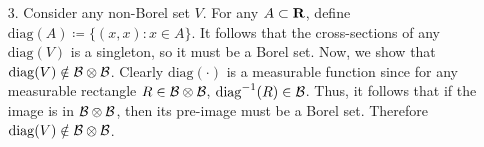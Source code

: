 \documentclass{article}
\theoremstyle{remark}
\newtheorem{claim}{Claim}
\newenvironment{poc}{\textit{Proof of claim:}}{\qed\\}
\begin{document}
\thispagestyle{firstpage}
\begin{enumerate}[leftmargin=*]
    \item[3.] Consider any non-Borel set $V$. For any $A \subset \mathbf{R}$, define $\mathrm{diag}(A) \coloneqq \{(x,x): x \in A\}$. It follows that the cross-sections of any $\mathrm{diag}(V)$ is a singleton, so it must be a Borel set. Now, we show that $\mathrm{diag}(V) \notin \mathcal{B} \otimes \mathcal{B}$. Clearly $\mathrm{diag}(\cdot)$ is a measurable function since for any measurable rectangle $R \in \mathcal{B}\otimes \mathcal{B}$, $\mathrm{diag}^{-1}(R) \in \mathcal{B}$. Thus, it follows that if the image is in $\mathcal{B} \otimes \mathcal{B}$, then its pre-image must be a Borel set. Therefore $\mathrm{diag}(V)\notin \mathcal{B}\otimes \mathcal{B}$.

\end{enumerate}
\end{document}
